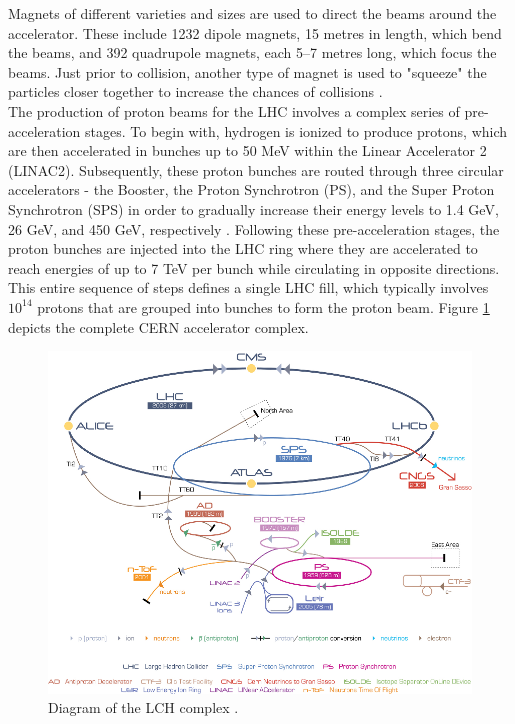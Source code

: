 Magnets of different varieties and sizes are used to direct the beams around the accelerator. These include 1232 dipole magnets, 15 metres in length, which bend the beams, and 392 quadrupole magnets, each 5–7 metres long, which focus the beams. Just prior to collision, another type of magnet is used to "squeeze" the particles closer together to increase the chances of collisions . \\

The production of proton beams for the LHC involves a complex series of pre-acceleration stages. To begin with, hydrogen is ionized to produce protons, which are then accelerated in bunches up to 50 MeV within the Linear Accelerator 2 (LINAC2). Subsequently, these proton bunches are routed through three circular accelerators - the Booster, the Proton Synchrotron (PS), and the Super Proton Synchrotron (SPS)  in order to gradually increase their energy levels to 1.4 GeV, 26 GeV, and 450 GeV, respectively \cite{lhc_complex}. Following these pre-acceleration stages, the proton bunches are injected into the LHC ring where they are accelerated to reach energies of up to 7 TeV per bunch while circulating in opposite directions. This entire sequence of steps defines a single LHC fill, which typically involves $10^{14}$ protons that are grouped into bunches to form the proton beam. Figure \ref{lhc_com} depicts the complete CERN accelerator complex.

\begin{center}
  \begin{figure}[h]
    \centering
    \includegraphics[scale=.45]{Chapter1/lhc_complex_fig.png}
    \caption[LHC Complex]{Diagram of the LCH complex \cite{lhc_complex}.}
    \label{lhc_com}
  \end{figure}
\end{center}

